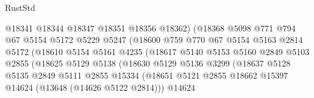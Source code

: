 \begin{lexlean}{RustStd}
\begin{coremodule}
                                  @18341
                                  @18344
                                  @18347
                                  @18351
                                  @18356
                                  @18362)
                                (@18368
                                  @5098
                                  @771
                                  @794
                                  @67
                                  @5154
                                  @5172
                                  @5229
                                  @5247
                                  (@18600
                                    @759
                                    @770
                                    @67
                                    @5154
                                    @5163
                                    @2814
                                    @5172
                                    (@18610
                                      @5154
                                      @5161
                                      @4235
                                      (@18617
                                        @5140
                                        @5153
                                        @5160
                                        @2849
                                        @5103
                                        @2855
                                        (@18625
                                          @5129
                                          @5138
                                          (@18630
                                            @5129
                                            @5136
                                            @3299
                                            (@18637
                                              @5128
                                              @5135
                                              @2849
                                              @5111
                                              @2855
                                              @15334
                                              (@18651
                                                @5121
                                                @2855
                                                @18662
                                                @15397
                                                @14624
                                                (@13648 (@14626 @5122 @2814)))
                                              @14624

\end{coremodule}
\end{lexlean}
